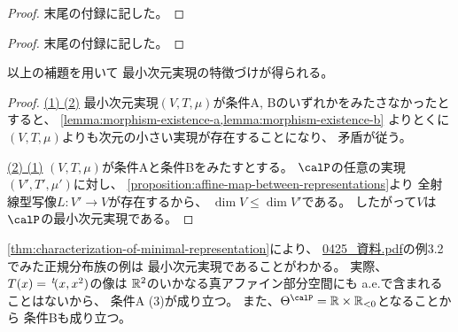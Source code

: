 \documentclass[report]{jlreq}
\begin{document}
\begin{proof}
    末尾の付録に記した。
\end{proof}


\begin{proof}
    末尾の付録に記した。
\end{proof}

以上の補題を用いて
最小次元実現の特徴づけが得られる。


\begin{proof}
    \uline{(1) \Rightarrow (2)} \quad
    最小次元実現$(V, T, \mu)$が条件A, Bのいずれかをみたさなかったとすると、
    \cref{lemma:morphism-existence-a,lemma:morphism-existence-b}
    よりとくに$(V, T, \mu)$よりも次元の小さい実現が存在することになり、
    矛盾が従う。

    \uline{(2) \Rightarrow (1)} \quad
    $(V, T, \mu)$が条件Aと条件Bをみたすとする。
    $\calP$の任意の実現
    $(V', T', \mu')$に対し、
    \cref{proposition:affine-map-between-representations}より
    全射線型写像$L: V' \to V$が存在するから、
    $\dim V \le \dim V'$である。
    したがって$V$は$\calP$の最小次元実現である。
\end{proof}

\begin{example}[正規分布族の最小次元実現]
    \cref{thm:characterization-of-minimal-representation}により、
    \url{0425_資料.pdf}の例3.2でみた正規分布族の例は
    最小次元実現であることがわかる。
    実際、
    $T(x) = \,{}^{t}\!(x, x^2)$の像は
    $\mathbb{R}^2$のいかなる真アファイン部分空間にも
    a.e.で含まれることはないから、
    条件A (3)が成り立つ。
    また、$\Theta^\calP = \R \times \R_{< 0}$となることから
    条件Bも成り立つ。
\end{example}
\end{document}
